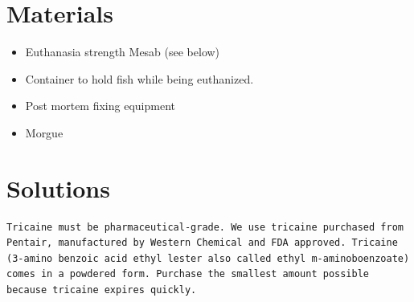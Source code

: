 \documentclass[
  letterpaper,
  DIV=11,
  numbers=noendperiod]{scrreprt}
\providecommand{\tightlist}{%
  \setlength{\itemsep}{0pt}\setlength{\parskip}{0pt}}\usepackage{longtable,booktabs,array}
\begin{document}
\hypertarget{materials-36}{%
\section{Materials}\label{materials-36}}

\begin{itemize}
\tightlist
\item
  Euthanasia strength Mesab (see below)
\item
  Container to hold fish while being euthanized.
\item
  Post mortem fixing equipment
\item
  Morgue
\end{itemize}

\hypertarget{solutions-28}{%
\section{Solutions}\label{solutions-28}}

\begin{tcolorbox}[enhanced jigsaw, rightrule=.15mm, title=\textcolor{quarto-callout-warning-color}{\faExclamationTriangle}\hspace{0.5em}{NOTES}, titlerule=0mm, opacitybacktitle=0.6, toprule=.15mm, bottomrule=.15mm, opacityback=0, left=2mm, colframe=quarto-callout-warning-color-frame, breakable, coltitle=black, colback=white, colbacktitle=quarto-callout-warning-color!10!white, bottomtitle=1mm, leftrule=.75mm, toptitle=1mm, arc=.35mm]

\begin{verbatim}
Tricaine must be pharmaceutical-grade. We use tricaine purchased from Pentair, manufactured by Western Chemical and FDA approved. Tricaine (3-amino benzoic acid ethyl lester also called ethyl m-aminoboenzoate) comes in a powdered form. Purchase the smallest amount possible because tricaine expires quickly.
\end{verbatim}

\end{tcolorbox}
\end{document}
